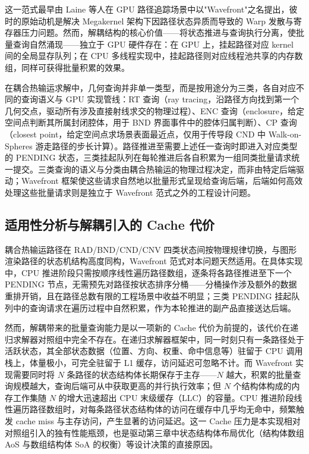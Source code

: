 这一范式最早由 Laine 等人在 GPU 路径追踪场景中以"Wavefront"之名提出，彼时的原始动机是解决 Megakernel 架构下因路径状态异质而导致的 Warp 发散与寄存器压力问题。然而，解耦结构的核心价值——将状态推进与查询执行分离，使批量查询自然涌现——独立于 GPU 硬件存在：在 GPU 上，挂起路径对应 kernel 间的全局显存队列；在 CPU 多线程实现中，挂起路径则对应线程池共享的内存数组，同样可获得批量积累的效果。

在耦合热输运求解中，几何查询并非单一类型，而是按用途分为三类，各自对应不同的查询语义与 GPU 实现管线：RT 查询（ray tracing，沿路径方向找到第一个几何交点，驱动所有涉及直接射线求交的物理过程）、ENC 查询（enclosure，给定空间点判断其所属封闭腔体，用于 BND 界面事件中的腔体归属判断）、CP 查询（closest point，给定空间点求场景表面最近点，仅用于传导段 CND 中 Walk-on-Spheres 游走路径的步长计算）。路径推进至需要上述任一查询时即进入对应类型的 PENDING 状态，三类挂起队列在每轮推进后各自积累为一组同类批量请求统一提交。三类查询的语义与分类由耦合热输运的物理过程决定，而非由特定后端驱动；Wavefront 框架使这些请求自然地以批量形式呈现给查询后端，后端如何高效处理这些批量请求则是独立于 Wavefront 范式之外的工程设计问题。

\subsection{适用性分析与解耦引入的 Cache 代价}

耦合热输运路径在 RAD/BND/CND/CNV 四类状态间按物理规律切换，与图形渲染路径的状态机结构高度同构，Wavefront 范式对本问题天然适用。在具体实现中，CPU 推进阶段只需按顺序线性遍历路径数组，逐条将各路径推进至下一个 PENDING 节点，无需预先对路径按状态排序分桶——分桶操作涉及额外的数据重排开销，且在路径总数有限的工程场景中收益不明显；三类 PENDING 挂起队列中的查询请求在遍历过程中自然积累，作为本轮推进的副产品直接送达后端。

然而，解耦带来的批量查询能力是以一项新的 Cache 代价为前提的，该代价在递归求解器对照组中完全不存在。在递归求解器框架中，同一时刻只有一条路径处于活跃状态，其全部状态数据（位置、方向、权重、命中信息等）驻留于 CPU 调用栈上，体量极小，可完全驻留于 L1 缓存，访问延迟可忽略不计。而 Wavefront 实现需要同时将 $N$ 条路径的状态结构体长期保存于主存——$N$ 越大，积累的批量查询规模越大，查询后端可从中获取更高的并行执行效率；但 $N$ 个结构体构成的内存工作集随 $N$ 的增大迅速超出 CPU 末级缓存（LLC）的容量。CPU 推进阶段线性遍历路径数组时，对每条路径状态结构体的访问在缓存中几乎均无命中，频繁触发 cache miss 与主存访问，产生显著的访问延迟。这一 Cache 压力是本实现相对对照组引入的独有性能瓶颈，也是驱动第三章中状态结构体布局优化（结构体数组 AoS 与数组结构体 SoA 的权衡）等设计决策的直接原因。

